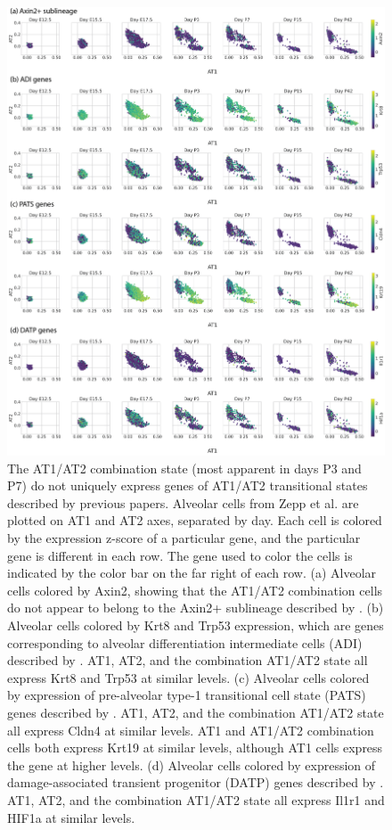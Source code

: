 \documentclass[aps,superscriptaddress, notitlepage,longbibliography]{revtex4-1}
\begin{document}
\begin{figure}
	\centering
	\includegraphics[scale=0.8]{figs/LungMAP genes.png}
	\caption{The AT1/AT2 combination state (most apparent in days P3 and P7) do not uniquely express genes of AT1/AT2 transitional states described by previous papers. Alveolar cells from Zepp et al. are plotted on AT1 and AT2 axes, separated by day. Each cell is colored by the expression z-score of a particular gene, and the particular gene is different in each row. The gene used to color the cells is indicated by the color bar on the far right of each row. (a) Alveolar cells colored by Axin2, showing that the AT1/AT2 combination cells do not appear to belong to the Axin2+ sublineage described by  \cite{frank2016emergence}. (b) Alveolar cells colored by Krt8 and Trp53 expression, which are genes corresponding to alveolar differentiation intermediate cells (ADI) described by \cite{strunz2020alveolar}. AT1, AT2, and the combination AT1/AT2 state all express Krt8 and Trp53 at similar levels. (c) Alveolar cells colored by expression of pre-alveolar type-1 transitional cell state (PATS) genes described by \cite{kobayashi2020persistence}. AT1, AT2, and the combination AT1/AT2 state all express Cldn4 at similar levels. AT1 and AT1/AT2 combination cells both express Krt19 at similar levels, although AT1 cells express the gene at higher levels. (d) Alveolar cells colored by expression of damage-associated transient progenitor (DATP) genes described by \cite{choi2020inflammatory}. AT1, AT2, and the combination AT1/AT2 state all express Il1r1 and HIF1a at similar levels. }
	\label{LungMAP genes}
\end{figure}
\end{document}
